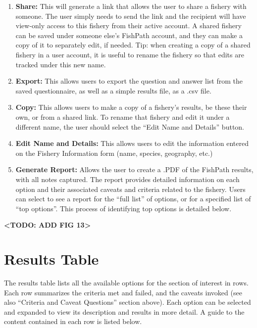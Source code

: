 \documentclass[11pt,]{book}
\providecommand{\tightlist}{%
  \setlength{\itemsep}{0pt}\setlength{\parskip}{0pt}}
\begin{document}
\begin{enumerate}
\def\labelenumi{\arabic{enumi}.}
\tightlist
\item
  \textbf{Share:} This will generate a link that allows the user to
  share a fishery with someone. The user simply needs to send the link
  and the recipient will have view-only access to this fishery from
  their active account. A shared fishery can be saved under someone
  else's FishPath account, and they can make a copy of it to separately
  edit, if needed. Tip: when creating a copy of a shared fishery in a
  user account, it is useful to rename the fishery so that edits are
  tracked under this new name.
\item
  \textbf{Export:} This allows users to export the question and answer
  list from the saved questionnaire, as well as a simple results file,
  as a .csv file.
\item
  \textbf{Copy:} This allows users to make a copy of a fishery's
  results, be these their own, or from a shared link. To rename that
  fishery and edit it under a different name, the user should select the
  ``Edit Name and Details'' button.
\item
  \textbf{Edit Name and Details:} This allows users to edit the
  information entered on the Fishery Information form (name, species,
  geography, etc.)
\item
  \textbf{Generate Report:} Allows the user to create a .PDF of the
  FishPath results, with all notes captured. The report provides
  detailed information on each option and their associated caveats and
  criteria related to the fishery. Users can select to see a report for
  the ``full list'' of options, or for a specified list of ``top
  options''. This process of identifying top options is detailed below.
\end{enumerate}

\textbf{\textless TODO: ADD FIG 13\textgreater{}}

\hypertarget{results-table}{%
\section{Results Table}\label{results-table}}

The results table lists all the available options for the section of
interest in rows. Each row summarizes the criteria met and failed, and
the caveats invoked (see also ``Criteria and Caveat Questions'' section
above). Each option can be selected and expanded to view its description
and results in more detail. A guide to the content contained in each row
is listed below.
\end{document}
